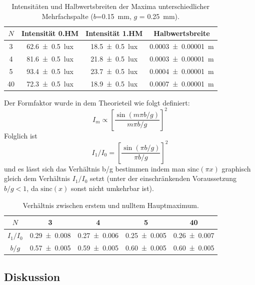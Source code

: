 \documentclass[
	a4paper,
	12pt,
	pagesize,
	ngerman
]{scrartcl}
\begin{document}
	

	\begin{table}[H]
		\centering
		\begin{tabular}{ c | c | c | c }
			$N$ &  Intensität 0.HM & Intensität 1.HM & Halbwertsbreite\\ \hline
			3 & \SI{62,6 +- 0,5}{lux} & \SI{18,5 +- 0,5}{lux} & \SI{0,0003+- 0,00001}{m} \\
			4 & \SI{81,6 +- 0,5}{lux} & \SI{21,8 +- 0,5}{lux} & \SI{0,0003+- 0,00001}{m} \\
			5 & \SI{93,4 +- 0,5}{lux} & \SI{23,7 +- 0,5}{lux} & \SI{0,0004+- 0,00001}{m} \\
			40& \SI{72,3 +- 0,5}{lux} & \SI{18,9 +- 0,5}{lux} & \SI{0,0007+- 0,00001}{m} \\
		\end{tabular}
		\caption{Intensitäten und Halbwertsbreiten der Maxima unterschiedlicher Mehrfachspalte ($b$=\SI{0,15}{mm}, $g$ = \SI{0,25}{mm}).}
		\label{GitterTabelle} 
	\end{table}
	
	Der Formfaktor wurde in dem Theorieteil wie folgt definiert: 
	\begin{equation}
		I_m \propto \left[\frac{\sin(m\pi b/g)}{m\pi b/g}\right]^2
	\end{equation}
	Folglich ist
	\begin{equation}
		I_1/I_0 = \left[\frac{\sin(\pi b/g)}{\pi b/g}\right]^2
	\end{equation}
	und es lässt sich das Verhältnis b/g bestimmen indem man $ \text{sinc}(\pi x)$ graphisch gleich dem Verhältnis $I_1/I_0$ setzt (unter der einschränkenden Voraussetzung $b/g<1$, da $\text{sinc}(x)$ sonst nicht umkehrbar ist).
	\begin{table}[H]
		\centering
		\begin{tabular}{ c | c | c | c | c }
			$N$ &  3 & 4 & 5 & 40\\ \hline
			$I_1/I_0$ & \SI{0,29+-0,008}{} & \SI{0,27+-0,006}{} & \SI{0,25+-0,005}{} & \SI{0,26+-0,007}{} \\
			$b/g$& \SI{0,57+-0,005}{} & \SI{0,59+-0,005}{} & \SI{0,60+-0,005}{} & \SI{0,60+-0,005}{} \\
		\end{tabular}
		\caption{Verhältnis zwischen erstem und nulltem Hauptmaximum. }
		\label{FormTabelle} 
	\end{table}
	\subsection{Diskussion}
	
\end{document}
